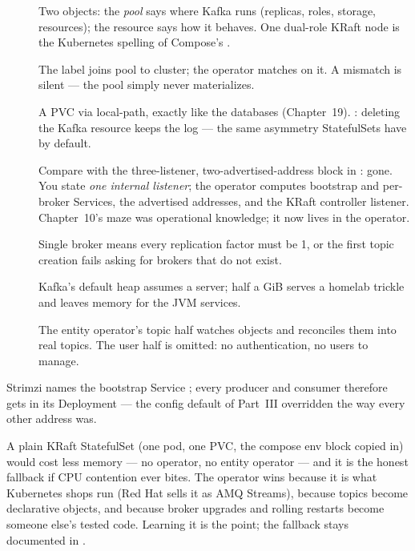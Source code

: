 \begin{description}
  \item[] Two objects: the \emph{pool} says where Kafka runs
  (replicas, roles, storage, resources); the  resource says
  how it behaves. One dual-role KRaft node is the Kubernetes spelling of
  Compose's .
  \item[] The label joins pool to cluster; the operator matches on
  it. A mismatch is silent --- the pool simply never materializes.
  \item[] A PVC via local-path, exactly like the databases
  (Chapter~19). : deleting the Kafka resource
  keeps the log --- the same asymmetry StatefulSets have by default.
  \item[] Compare with the three-listener, two-advertised-address
  block in : gone. You state \emph{one
  internal listener}; the operator computes bootstrap and per-broker
  Services, the advertised addresses, and the KRaft controller listener.
  Chapter~10's maze was operational knowledge; it now lives in the
  operator.
  \item[] Single broker means every replication factor must be 1,
  or the first topic creation fails asking for brokers that do not
  exist.
  \item[] Kafka's default heap assumes a server; half a GiB
  serves a homelab trickle and leaves memory for the JVM services.
  \item[] The entity operator's topic half watches
   objects and reconciles them into real topics. The
  user half is omitted: no authentication, no users to manage.
\end{description}

Strimzi names the bootstrap Service ;
every producer and consumer therefore gets
in its Deployment --- the  config default of
Part~III overridden the way every other address was.

\begin{decision}
A plain KRaft StatefulSet (one pod, one PVC, the compose env block
copied in) would cost less memory --- no operator, no entity operator
--- and it is the honest fallback if CPU contention ever bites. The
operator wins because it is what Kubernetes shops run (Red Hat sells it
as AMQ Streams), because topics become declarative objects, and because
broker upgrades and rolling restarts become someone else's tested code.
Learning it is the point; the fallback stays documented in
.
\end{decision}

